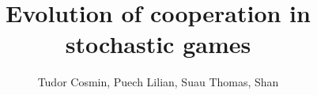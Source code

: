 \documentclass[]{article}
\title{Evolution of cooperation in stochastic games}
\author{Tudor Cosmin, Puech Lilian, Suau Thomas, Shan}
\begin{document}
\maketitle

\begin{abstract}

\end{abstract}

\section{}
\end{document}
